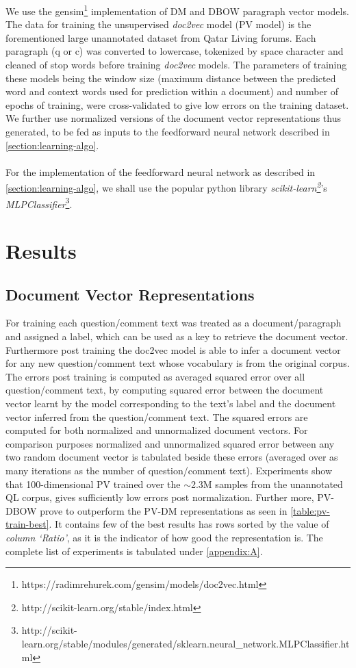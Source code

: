 \documentclass[12pt, a4paper, oneside]{Thesis} %
\begin{document}
We use the gensim\footnote{https://radimrehurek.com/gensim/models/doc2vec.html} implementation of DM and DBOW paragraph vector models. The data for training the unsupervised \textit{doc2vec} model (PV model) is the forementioned large unannotated dataset from Qatar Living forums. Each paragraph (q or c) was converted to lowercase, tokenized by space character and cleaned of stop words before training \textit{doc2vec} models. The parameters of training these models being the window size (maximum distance between the predicted word and context words used for prediction within a document) and number of epochs of training, were cross-validated to give low errors on the training dataset. We further use normalized versions of the document vector representations thus generated, to be fed as inputs to the feedforward neural network described in \autoref{section:learning-algo}. \\ \\
For the implementation of the feedforward neural network as described in \autoref{section:learning-algo}, we shall use the popular python library \textit{scikit-learn\footnote{http://scikit-learn.org/stable/index.html}}'s \textit{MLPClassifier}\footnote{http://scikit-learn.org/stable/modules/generated/sklearn.neural\_network.MLPClassifier.html}.

\section{Results}

\subsection{Document Vector Representations}

For training each question/comment text was treated as a document/paragraph and assigned a label, which can be used as a key to retrieve the document vector. Furthermore post training the doc2vec model is able to infer a document vector for any new question/comment text whose vocabulary is from the original corpus. The errors post training is computed as averaged squared error over all question/comment text, by computing squared error between the document vector learnt by the model corresponding to the text’s label and the document vector inferred from the question/comment text. The squared errors are computed for both normalized and unnormalized document vectors. For comparison purposes normalized and unnormalized squared error between any two random document vector is tabulated beside these errors (averaged over as many iterations as the number of question/comment text). Experiments show that 100-dimensional PV trained over the $\sim$2.3M samples from the unannotated QL corpus, gives sufficiently low errors post normalization. Further more, PV-DBOW prove to outperform the PV-DM representations as seen in \autoref{table:pv-train-best}. It contains few of the best results has rows sorted by the value of \textit{column \lq{Ratio}\rq}, as it is the indicator of how good the representation is. The complete list of experiments is tabulated under \autoref{appendix:A}.
\end{document}
